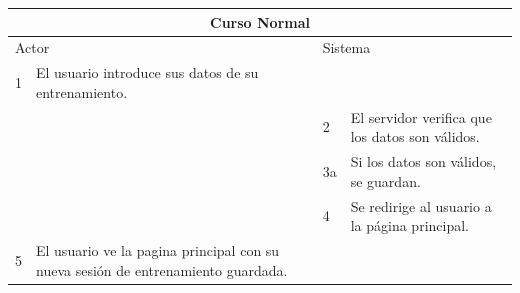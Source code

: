 \begin{itemize}
\begin{itemize}
\begin{table}[H]
      \centering
      \begin{tabularx}{\textwidth}{|l|X|l|X|}
        \hline
        \multicolumn{4}{|c|}{\cellcolor[HTML]{C0C0C0}Curso Normal}                                                 \\ \hline
        \multicolumn{2}{|l|}{\cellcolor[HTML]{EFEFEF}Actor} & \multicolumn{2}{l|}{\cellcolor[HTML]{EFEFEF}Sistema} \\ \hline
        1                         & El usuario introduce sus datos de su entrenamiento.                         &                            &                         \\ \hline
                                  &                         & 2                          & El servidor verifica que los datos son válidos.                      \\ \hline
                                 &                        &      3a                    & Si los datos son válidos, se guardan.                   \\ \hline
                                  &                         & 4                          & Se redirige al usuario a la página principal.                        \\ \hline
        5                       & El usuario ve la pagina principal con su nueva sesión de entrenamiento guardada.      &                          &                        \\ \hline
      

\end{tabularx}
\end{table}
\end{itemize}
\end{itemize}
